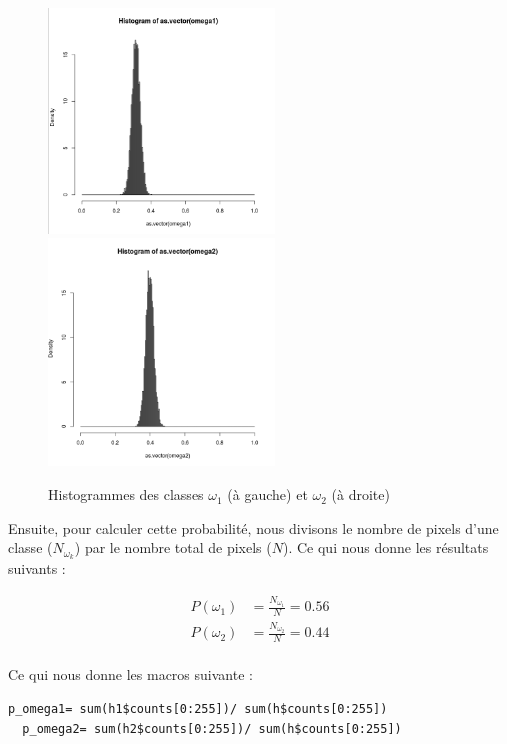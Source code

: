 \documentclass[a4paper,11pt]{article}
\begin{document}
  \begin{figure}[H]
    \center
    \includegraphics[width=6cm]{resultat/hist_omega1.png}
    \includegraphics[width=6cm]{resultat/hist_omega2.png}
    \caption{Histogrammes des classes $\omega_{1}$ (à gauche) et $\omega_{2}$ (à droite)}
  \end{figure}
  
  Ensuite, pour calculer cette probabilité, nous divisons le nombre de pixels d'une classe ($N_{\omega_k}$) par
  le nombre total de pixels ($N$). Ce qui nous donne les résultats suivants :
  
  \begin{align*}
    P(\omega_{1}) &= \frac{ N_{\omega_{1}} }{ N } = 0.56 \\
    P(\omega_{2}) &= \frac{ N_{\omega_{2}} }{ N } = 0.44 \\
  \end{align*}
  
  Ce qui nous donne les macros suivante :\\
  
  \begin{lstlisting}[caption=Macros de calcule de probabilité à priori des classe $N_{w_1}$ et $N_{w_2}$]
  p_omega1= sum(h1$counts[0:255])/ sum(h$counts[0:255])
  p_omega2= sum(h2$counts[0:255])/ sum(h$counts[0:255])\end{lstlisting}
  
\end{document}
